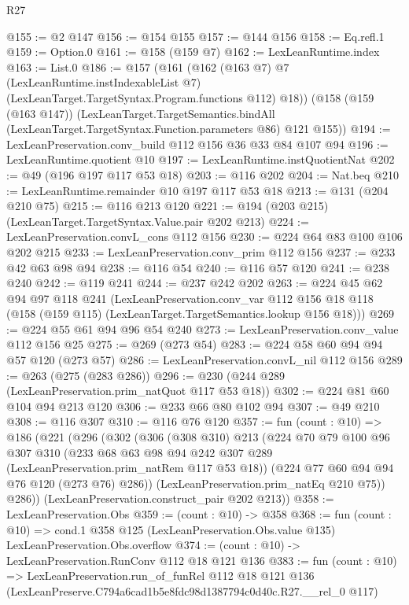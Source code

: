 \begin{lexlean}{R27}
\begin{coremodule}
@155 := @2 @147
@156 := @154 @155
@157 := @144 @156
@158 := Eq.refl.{1}
@159 := Option.{0}
@161 := @158 (@159 @7)
@162 := LexLeanRuntime.index
@163 := List.{0}
@186 := @157
    (@161
      (@162
        (@163 @7)
        @7
        (LexLeanRuntime.instIndexableList @7)
        (LexLeanTarget.TargetSyntax.Program.functions @112)
        @18))
    (@158
      (@159 (@163 @147))
      (LexLeanTarget.TargetSemantics.bindAll
        (LexLeanTarget.TargetSyntax.Function.parameters @86)
        @121
        @155))
@194 := LexLeanPreservation.conv_build @112 @156 @36 @33 @84 @107 @94
@196 := LexLeanRuntime.quotient @10
@197 := LexLeanRuntime.instQuotientNat
@202 := @49 (@196 @197 @117 @53 @18)
@203 := @116 @202
@204 := Nat.beq
@210 := LexLeanRuntime.remainder @10 @197 @117 @53 @18
@213 := @131 (@204 @210 @75)
@215 := @116 @213 @120
@221 := @194 (@203 @215) (LexLeanTarget.TargetSyntax.Value.pair @202 @213)
@224 := LexLeanPreservation.convL_cons @112 @156
@230 := @224 @64 @83 @100 @106 @202 @215
@233 := LexLeanPreservation.conv_prim @112 @156
@237 := @233 @42 @63 @98 @94
@238 := @116 @54
@240 := @116 @57 @120
@241 := @238 @240
@242 := @119 @241
@244 := @237 @242 @202
@263 := @224
    @45
    @62
    @94
    @97
    @118
    @241
    (LexLeanPreservation.conv_var
      @112
      @156
      @18
      @118
      (@158 (@159 @115) (LexLeanTarget.TargetSemantics.lookup @156 @18)))
@269 := @224 @55 @61 @94 @96 @54 @240
@273 := LexLeanPreservation.conv_value @112 @156 @25
@275 := @269 (@273 @54)
@283 := @224 @58 @60 @94 @94 @57 @120 (@273 @57)
@286 := LexLeanPreservation.convL_nil @112 @156
@289 := @263 (@275 (@283 @286))
@296 := @230 (@244 @289 (LexLeanPreservation.prim_natQuot @117 @53 @18))
@302 := @224 @81 @60 @104 @94 @213 @120
@306 := @233 @66 @80 @102 @94
@307 := @49 @210
@308 := @116 @307
@310 := @116 @76 @120
@357 := fun (count : @10) =>
  @186
    (@221
      (@296
        (@302
          (@306
            (@308 @310)
            @213
            (@224
              @70
              @79
              @100
              @96
              @307
              @310
              (@233 @68 @63 @98 @94 @242 @307 @289 (LexLeanPreservation.prim_natRem @117 @53 @18))
              (@224 @77 @60 @94 @94 @76 @120 (@273 @76) @286))
            (LexLeanPreservation.prim_natEq @210 @75))
          @286))
      (LexLeanPreservation.construct_pair @202 @213))
@358 := LexLeanPreservation.Obs
@359 := (count : @10) -> @358
@368 := fun (count : @10) =>
  cond.{1} @358 @125 (LexLeanPreservation.Obs.value @135) LexLeanPreservation.Obs.overflow
@374 := (count : @10) -> LexLeanPreservation.RunConv @112 @18 @121 @136
@383 := fun (count : @10) =>
  LexLeanPreservation.run_of_funRel
    @112
    @18
    @121
    @136
    (LexLeanPreserve.C794a6cad1b5e8fdc98d1387794c0d40c.R27.__rel_0 @117)
\end{coremodule}
\end{lexlean}
